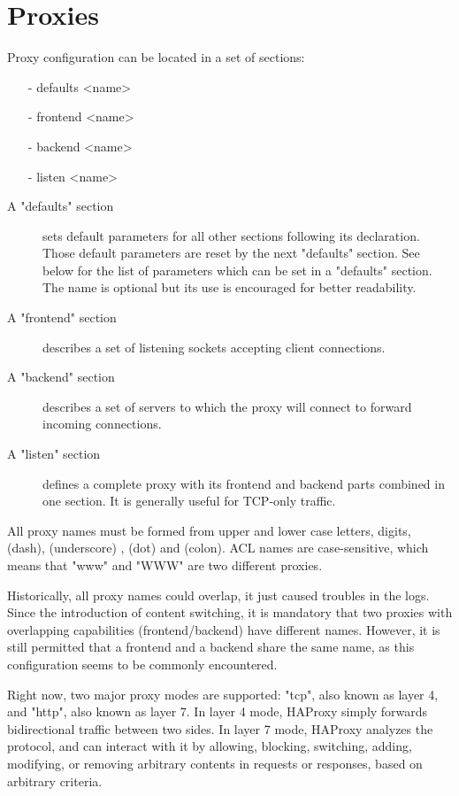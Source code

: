 \chapter{Proxies}
\label{chap:proxies}

Proxy configuration can be located in a set of sections:

\begin{itemize}
\item[-] defaults <name>
\item[-] frontend <name>
\item[-] backend  <name>
\item[-] listen   <name>
\end{itemize}

\begin{description}
\item[A "defaults" section] sets default parameters for all other sections following
its declaration. Those default parameters are reset by the next "defaults"
section. See below for the list of parameters which can be set in a "defaults"
section. The name is optional but its use is encouraged for better readability.

\item[A "frontend" section] describes a set of listening sockets accepting client
connections.

\item[A "backend" section] describes a set of servers to which the proxy will connect
to forward incoming connections.

\item[A "listen" section] defines a complete proxy with its frontend and backend
parts combined in one section. It is generally useful for TCP-only traffic.
\end{description}

All proxy names must be formed from upper and lower case letters, digits,
\chr{-} (dash), \chr{\_} (underscore) ,  (dot) and \chr{:} (colon). ACL names are
case-sensitive, which means that "www" and "WWW" are two different proxies.

Historically, all proxy names could overlap, it just caused troubles in the
logs. Since the introduction of content switching, it is mandatory that two
proxies with overlapping capabilities (frontend/backend) have different names.
However, it is still permitted that a frontend and a backend share the same
name, as this configuration seems to be commonly encountered.

Right now, two major proxy modes are supported: "tcp", also known as layer 4,
and "http", also known as layer 7. In layer 4 mode, HAProxy simply forwards
bidirectional traffic between two sides. In layer 7 mode, HAProxy analyzes the
protocol, and can interact with it by allowing, blocking, switching, adding,
modifying, or removing arbitrary contents in requests or responses, based on
arbitrary criteria.

